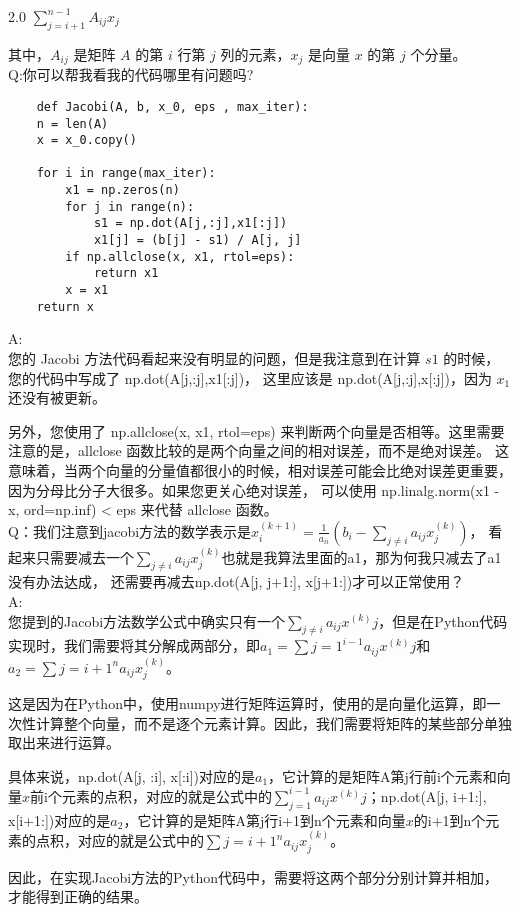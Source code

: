 \documentclass[12pt, a4paper, oneside]{article}
\begin{document}
\begin{spacing}{2.0}
$\sum_{j=i+1}^{n-1} A_{ij} x_j$

其中，$A_{ij}$ 是矩阵 $A$ 的第 $i$ 行第 $j$ 列的元素，$x_j$ 是向量 $x$ 的第 $j$ 个分量。\\
Q:你可以帮我看我的代码哪里有问题吗?\\
\begin{lstlisting}
    def Jacobi(A, b, x_0, eps , max_iter):
    n = len(A)
    x = x_0.copy()

    for i in range(max_iter):
        x1 = np.zeros(n)
        for j in range(n):
            s1 = np.dot(A[j,:j],x1[:j])
            x1[j] = (b[j] - s1) / A[j, j]
        if np.allclose(x, x1, rtol=eps):
            return x1
        x = x1
    return x
\end{lstlisting}
A:\\
您的 Jacobi 方法代码看起来没有明显的问题，但是我注意到在计算 $s1$ 的时候，您的代码中写成了 np.dot(A[j,:j],x1[:j])，
这里应该是 np.dot(A[j,:j],x[:j])，因为 $x_1$ 还没有被更新。

另外，您使用了 np.allclose(x, x1, rtol=eps) 来判断两个向量是否相等。这里需要注意的是，allclose 函数比较的是两个向量之间的相对误差，而不是绝对误差。
这意味着，当两个向量的分量值都很小的时候，相对误差可能会比绝对误差更重要，因为分母比分子大很多。如果您更关心绝对误差，
可以使用 np.linalg.norm(x1 - x, ord=np.inf) < eps 来代替 allclose 函数。\\
Q：我们注意到jacobi方法的数学表示是$x^{(k+1)}_i  = \frac{1}{a_{ii}} \left(b_i -\sum_{j\ne i}a_{ij}x^{(k)}_j\right)$，
看起来只需要减去一个$\sum_{j\ne i}a_{ij}x^{(k)}_j$也就是我算法里面的a1，那为何我只减去了a1没有办法达成，
还需要再减去np.dot(A[j, j+1:], x[j+1:])才可以正常使用？\\
A:\\
您提到的Jacobi方法数学公式中确实只有一个$\sum_{j\ne i}a_{ij}x^{(k)}j$，但是在Python代码实现时，我们需要将其分解成两部分，即$a_1 = \sum{j=1}^{i-1} a_{ij}x^{(k)}j$和$a_2 = \sum{j=i+1}^{n} a_{ij}x^{(k)}_j$。

这是因为在Python中，使用numpy进行矩阵运算时，使用的是向量化运算，即一次性计算整个向量，而不是逐个元素计算。因此，我们需要将矩阵的某些部分单独取出来进行运算。

具体来说，np.dot(A[j, :i], x[:i])对应的是$a_1$，它计算的是矩阵A第j行前i个元素和向量$x$前i个元素的点积，对应的就是公式中的$\sum_{j=1}^{i-1} a_{ij}x^{(k)}j$；np.dot(A[j, i+1:], x[i+1:])对应的是$a_2$，它计算的是矩阵A第j行i+1到n个元素和向量$x$的i+1到n个元素的点积，对应的就是公式中的$\sum{j=i+1}^{n} a_{ij}x^{(k)}_j$。

因此，在实现Jacobi方法的Python代码中，需要将这两个部分分别计算并相加，才能得到正确的结果。













\end{spacing}{}



\end{document}
